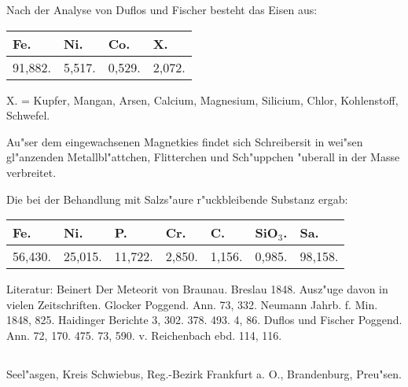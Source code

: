 \documentclass[a4paper, 11pt, oneside]{article}
\begin{document}
Nach der Analyse von Duflos und Fischer besteht das Eisen aus:
\begin{table}[H]
    \centering\swabfamily\Large
    \begin{tabular}{l l l l}
        Fe. & Ni. & Co. & X. \\ \hline
        91,882. & 5,517. & 0,529. & 2,072. \\
    \end{tabular}
\end{table}

X. = Kupfer, Mangan, Arsen, Calcium, Magnesium, Silicium, Chlor, Kohlenstoff, Schwefel.

Au"ser dem eingewachsenen Magnetkies findet sich Schreibersit in wei"sen gl"anzenden Metallbl"attchen, Flitterchen und Sch"uppchen "uberall in der Masse verbreitet.

Die bei der Behandlung mit Salzs"aure r"uckbleibende Substanz ergab:
\begin{table}[H]
    \centering\swabfamily\Large
    \begin{tabular}{l l l l l l l}
        Fe. & Ni. & P. & Cr. & C. & SiO$_{3}$. & Sa. \\ \hline
        56,430. & 25,015. & 11,722. & 2,850. & 1,156. & 0,985. & 98,158. \\
    \end{tabular}
\end{table}

\normalsize
Literatur: Beinert Der Meteorit von Braunau. Breslau 1848. Ausz"uge davon in vielen Zeitschriften. Glocker Poggend. Ann. 73, 332. Neumann Jahrb. f. Min. 1848, 825. Haidinger Berichte 3, 302. 378. 493. 4, 86. Duflos und Fischer Poggend. Ann. 72, 170. 475. 73, 590. v. Reichenbach ebd. 114, 116.

\subsection{}
\LARGE
\paragraph{}
Seel"asgen, Kreis Schwiebus, Reg.-Bezirk Frankfurt a. O., Brandenburg, Preu"sen.
\end{document}
